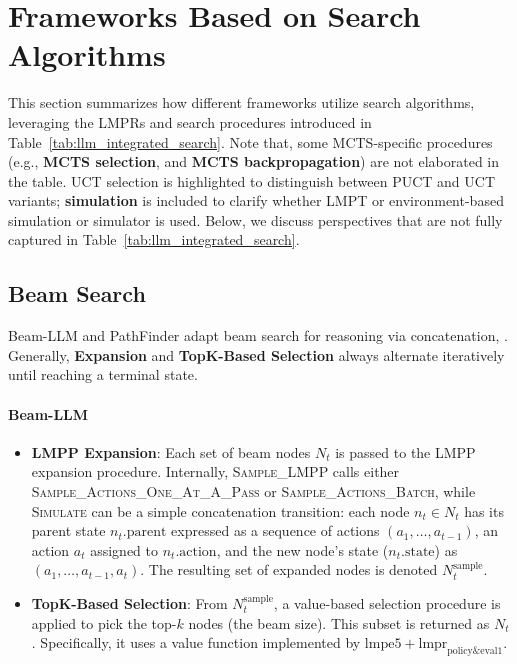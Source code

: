

\section{Frameworks Based on Search Algorithms}
\label{sec:search}

This section summarizes how different frameworks utilize search algorithms, leveraging the LMPRs and search procedures introduced in Table~\ref{tab:llm_integrated_search}. Note that, some MCTS-specific procedures (e.g., \textbf{MCTS selection}, and \textbf{MCTS backpropagation}) are not elaborated in the table. UCT selection is highlighted to distinguish between PUCT and UCT variants; \textbf{simulation} is included to clarify whether LMPT or environment-based simulation or simulator is used.
Below, we discuss perspectives that are not fully captured in Table~\ref{tab:llm_integrated_search}.

\subsection{Beam Search}
\label{sec:beam}
Beam-LLM \citep{xie2023selfevaluation} and PathFinder \citep{golovneva2023pathfinder} adapt beam search for reasoning via concatenation, . 
Generally, \textbf{Expansion} and \textbf{TopK-Based Selection} always alternate iteratively until reaching a terminal state.

\paragraph{Beam-LLM \citep{xie2023selfevaluation}}
\begin{itemize}
    \item \textbf{LMPP Expansion}:
    Each set of beam nodes \(N_t\) is passed to the LMPP expansion procedure. Internally, \textsc{Sample\_LMPP} calls either \textsc{Sample\_Actions\_One\_At\_A\_Pass} or \textsc{Sample\_Actions\_Batch}, while \textsc{Simulate} can be a simple concatenation transition: each node \(n_t \in N_t\) has its parent state \(n_t.\text{parent}\) expressed as a sequence of actions \((a_1, \dots, a_{t-1})\), an action \(a_t\) assigned to \(n_t.\text{action}\), and the new node’s state ($n_t.\text{state}$) as \((a_1, \dots, a_{t-1}, a_t)\). The resulting set of expanded nodes is denoted \(N_{t}^{\text{sample}}\).
    
    \item \textbf{TopK-Based Selection}:
     From \(N_{t}^{\text{sample}}\), a value-based selection procedure  is applied to pick the top-\(k\) nodes (the beam size). This subset is returned as \(N_{t}\). 
     Specifically, it uses a value function implemented by \(\text{lmpe5} + \text{lmpr}_\text{policy\&eval1}\).
\end{itemize}



